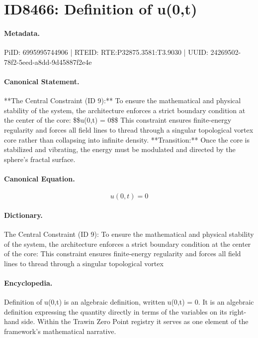 \section*{ID8466: Definition of u(0,t)}
\paragraph{Metadata.}
PiID: 6995995744906 | RTEID: RTE:P32875.3581:T3.9030 | UUID: 24269502-78f2-5eed-a8dd-9d45887f2e4e

\paragraph{Canonical Statement.}
**The Central Constraint (ID 9):** To ensure the mathematical and physical stability of the system, the architecture enforces a strict boundary condition at the center of the core: \$\$u(0,t) = 0\$\$ This constraint ensures finite-energy regularity and forces all field lines to thread through a singular topological vortex core rather than collapsing into infinite density. **Transition:** Once the core is stabilized and vibrating, the energy must be modulated and directed by the sphere’s fractal surface.

\paragraph{Canonical Equation.}
\[
u(0,t) = 0
\]

\paragraph{Dictionary.}
The Central Constraint (ID 9): To ensure the mathematical and physical stability of the system, the architecture enforces a strict boundary condition at the center of the core: This constraint ensures finite-energy regularity and forces all field lines to thread through a singular topological vortex

\paragraph{Encyclopedia.}
Definition of u(0,t) is an algebraic definition, written u(0,t) = 0. It is an algebraic definition expressing the quantity directly in terms of the variables on its right-hand side. Within the Trawin Zero Point registry it serves as one element of the framework's mathematical narrative.
